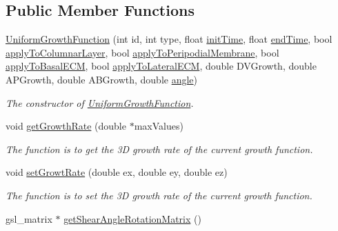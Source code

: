\subsection*{Public Member Functions}
\begin{DoxyCompactItemize}
\item 
\hyperlink{classUniformGrowthFunction_a9ea553c72b2d5e83e98e4ec7a8c025b6}{Uniform\+Growth\+Function} (int id, int type, float \hyperlink{classGrowthFunctionBase_ae92513a7b41637df8e26e7db35ddf97c}{init\+Time}, float \hyperlink{classGrowthFunctionBase_a3ff4db0573d354a75666a5f3ca446941}{end\+Time}, bool \hyperlink{classGrowthFunctionBase_a3d56771e7c145589a14e11cc331e0326}{apply\+To\+Columnar\+Layer}, bool \hyperlink{classGrowthFunctionBase_a08ae19f58cb98fa8e315a77f52749732}{apply\+To\+Peripodial\+Membrane}, bool \hyperlink{classGrowthFunctionBase_a9fe46fc6dde4041b79204beb48972a09}{apply\+To\+Basal\+E\+C\+M}, bool \hyperlink{classGrowthFunctionBase_ac623b1dbe376bce5dddbe1a2e21c776f}{apply\+To\+Lateral\+E\+C\+M}, double D\+V\+Growth, double A\+P\+Growth, double A\+B\+Growth, double \hyperlink{classUniformGrowthFunction_a1a985ff52f9796688e00942b4d3349f8}{angle})
\begin{DoxyCompactList}\small\item\em The constructor of \hyperlink{classUniformGrowthFunction}{Uniform\+Growth\+Function}. \end{DoxyCompactList}\item 
void \hyperlink{classUniformGrowthFunction_ad5be18ae004a3eed205ab3570e13202a}{get\+Growth\+Rate} (double $\ast$max\+Values)
\begin{DoxyCompactList}\small\item\em The function is to get the 3\+D growth rate of the current growth function. \end{DoxyCompactList}\item 
void \hyperlink{classUniformGrowthFunction_aff899907569af697d47927f61b6871a5}{set\+Growt\+Rate} (double ex, double ey, double ez)
\begin{DoxyCompactList}\small\item\em The function is to set the 3\+D growth rate of the current growth function. \end{DoxyCompactList}\item 
\hypertarget{classUniformGrowthFunction_a5a7e9b102a299b94ba648513b66f9cd1}{}gsl\+\_\+matrix $\ast$ \hyperlink{classUniformGrowthFunction_a5a7e9b102a299b94ba648513b66f9cd1}{get\+Shear\+Angle\+Rotation\+Matrix} ()\label{classUniformGrowthFunction_a5a7e9b102a299b94ba648513b66f9cd1}


\end{DoxyCompactItemize}
